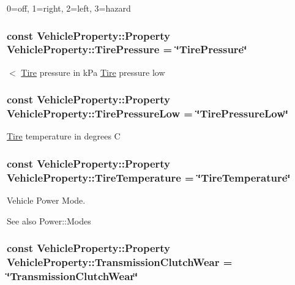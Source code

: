 0=off, 1=right, 2=left, 3=hazard \hypertarget{classVehicleProperty_a4709c7da616ca84dd4533562319d9bb8}{
\subsubsection[{Tire\+Pressure}]{\setlength{\rightskip}{0pt plus 5cm}const Vehicle\+Property\+::\+Property Vehicle\+Property\+::\+Tire\+Pressure = \char`\"{}Tire\+Pressure\char`\"{}\hspace{0.3cm}{\ttfamily [static]}}}\label{classVehicleProperty_a4709c7da616ca84dd4533562319d9bb8}
$<$ \hyperlink{interfaceTire}{Tire} pressure in k\+Pa \hyperlink{interfaceTire}{Tire} pressure low \hypertarget{classVehicleProperty_a39e0314efcb1040a285d8d71ff5cd701}{
\subsubsection[{Tire\+Pressure\+Low}]{\setlength{\rightskip}{0pt plus 5cm}const Vehicle\+Property\+::\+Property Vehicle\+Property\+::\+Tire\+Pressure\+Low = \char`\"{}Tire\+Pressure\+Low\char`\"{}\hspace{0.3cm}{\ttfamily [static]}}}\label{classVehicleProperty_a39e0314efcb1040a285d8d71ff5cd701}
\hyperlink{interfaceTire}{Tire} temperature in degrees C \hypertarget{classVehicleProperty_a6ec2a936e26226d1cb9fb84262e6adc2}{
\subsubsection[{Tire\+Temperature}]{\setlength{\rightskip}{0pt plus 5cm}const Vehicle\+Property\+::\+Property Vehicle\+Property\+::\+Tire\+Temperature = \char`\"{}Tire\+Temperature\char`\"{}\hspace{0.3cm}{\ttfamily [static]}}}\label{classVehicleProperty_a6ec2a936e26226d1cb9fb84262e6adc2}
Vehicle Power Mode. \begin{DoxySeeAlso}{See also}
Power\+::\+Modes 
\end{DoxySeeAlso}
\hypertarget{classVehicleProperty_a4abb5cb7193d2836c49962c34f8ddc0f}{
\subsubsection[{Transmission\+Clutch\+Wear}]{\setlength{\rightskip}{0pt plus 5cm}const Vehicle\+Property\+::\+Property Vehicle\+Property\+::\+Transmission\+Clutch\+Wear = \char`\"{}Transmission\+Clutch\+Wear\char`\"{}\hspace{0.3cm}{\ttfamily [static]}}}\label{classVehicleProperty_a4abb5cb7193d2836c49962c34f8ddc0f}
